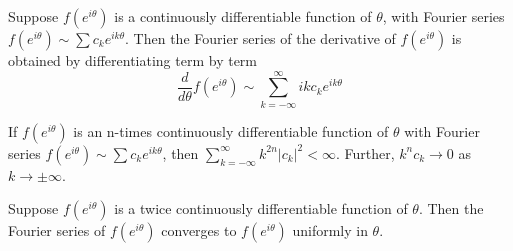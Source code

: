 \begin{theorem}
    Suppose $f(e^{i\theta})$ is a continuously differentiable function of $\theta$, with Fourier series $f(e^{i\theta}) \sim \sum c_ke^{ik\theta}$. Then the Fourier series of the derivative of $f(e^{i\theta})$ is obtained by differentiating term by term \begin{equation*}
        \frac{d}{d\theta}f(e^{i\theta}) \sim \sum_{k=-\infty}^{\infty}ikc_ke^{ik\theta}
    \end{equation*}
\end{theorem}


\begin{corollary}
    If $f(e^{i\theta})$ is an n-times continuously differentiable function of $\theta$ with Fourier series $f(e^{i\theta}) \sim \sum c_ke^{ik\theta}$, then $\sum_{k=-\infty}^{\infty}k^{2n}|c_k|^2 < \infty$. Further, $k^nc_k\rightarrow 0$ as $k\rightarrow \pm\infty$.
\end{corollary}

\begin{theorem}
    Suppose $f(e^{i\theta})$ is a twice continuously differentiable function of $\theta$. Then the Fourier series of $f(e^{i\theta})$ converges to $f(e^{i\theta})$ uniformly in $\theta$.
\end{theorem}

